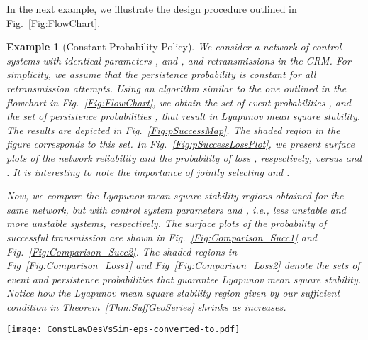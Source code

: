 \documentclass[twocolumn]{autart}
\newtheorem{example}{Example}[section]
\begin{document}
In the next example, we illustrate the design procedure outlined in Fig.~\ref{Fig:FlowChart}.
\begin{example}[Constant-Probability Policy] \label{Ex:ConstLawDesign}
We consider a network of  control systems with identical parameters ,  and , and  retransmissions in the CRM. For simplicity, we assume that the persistence probability  is constant for all retransmission attempts. Using an algorithm similar to the one outlined in the flowchart in Fig.~\ref{Fig:FlowChart}, we obtain the set of event probabilities , and the set of persistence probabilities , that result in Lyapunov mean square stability. The results are depicted in Fig.~\ref{Fig:pSuccessMap}. The shaded region in the figure corresponds to this set. In Fig.~\ref{Fig:pSuccessLossPlot}, we present surface plots of the network reliability  and the probability of loss , respectively, versus  and . It is interesting to note the importance of jointly selecting  and .

Now, we compare the Lyapunov mean square stability regions obtained for the same network, but with control system parameters  and , i.e., less unstable and more unstable systems, respectively. The surface plots of the probability of successful transmission are shown in Fig.~\ref{Fig:Comparison_Succ1} and Fig.~\ref{Fig:Comparison_Succ2}. The shaded regions in Fig~\ref{Fig:Comparison_Loss1} and Fig~\ref{Fig:Comparison_Loss2} denote the sets of event and persistence probabilities that guarantee Lyapunov mean square stability. Notice how the Lyapunov mean square stability region given by our sufficient condition in Theorem~\ref{Thm:SuffGeoSeries} shrinks as  increases.
\end{example}

\begin{figure*}[ptb] \label{Fig:SimResults}
\centering
\texttt{[image: ConstLawDesVsSim-eps-converted-to.pdf]}
\caption[Constant Law Policy]{A comparison of analytical and simulated values of the event probability , plotted against the axis on the left. The numerically computed values of the event thresholds  are plotted against the axis on the right. }
\end{figure*}
\end{document}
